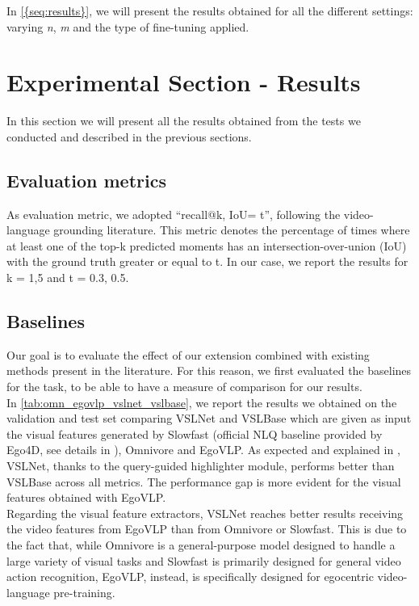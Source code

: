 \documentclass[10pt,twocolumn,letterpaper]{article}
\begin{document}
In \cref{{seq:results}}, we will present the results obtained for all the different settings: varying \textit{n}, \textit{m} and the type of fine-tuning applied.



\section{Experimental Section - Results}
\label{seq:results}
In this section we will present all the results obtained from the tests we conducted and described in the previous sections.
\subsection{Evaluation metrics}
As evaluation metric, we adopted “recall@k, IoU= t”, following the video-language grounding literature. This metric denotes the percentage of times where at least one of the top-k predicted moments has an intersection-over-union (IoU) with the ground truth greater or equal to t. In our case, we report the results for k = {1,5} and t = {0.3, 0.5}.
\subsection{Baselines}
Our goal is to evaluate the effect of our extension combined with existing methods present in the literature. For this reason, we first evaluated the baselines for the task, to be able to have a measure of comparison for our results. \\
In \cref{tab:omn_egovlp_vslnet_vslbase}, we report the results we obtained on the validation and test set comparing VSLNet and VSLBase which are given as input the visual features generated by Slowfast (official NLQ baseline provided by Ego4D, see details in \cite{grauman2022ego4d}), Omnivore and EgoVLP. 
As expected and explained in \cite{zhang2020spanbasedlocalizingnetworknatural}, VSLNet, thanks to the query-guided highlighter module, performs better than VSLBase across all metrics. The performance gap is more evident for the visual features obtained with EgoVLP. \\
Regarding the visual feature extractors, VSLNet reaches better results receiving the video features from EgoVLP than from Omnivore or Slowfast. This is due to the fact that, while Omnivore is a general-purpose model designed to handle a large variety of visual tasks and Slowfast is primarily designed for general video action recognition, EgoVLP, instead, is specifically designed for egocentric video-language pre-training.
\end{document}
